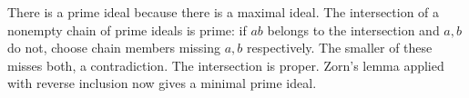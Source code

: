 There is a prime ideal because there is a maximal ideal. The intersection of a nonempty chain of prime ideals is prime: if $ab$ belongs to the intersection and $a,b$ do not, choose chain members missing $a,b$ respectively. The smaller of these misses both, a contradiction. The intersection is proper. Zorn's lemma applied with reverse inclusion now gives a minimal prime ideal.
